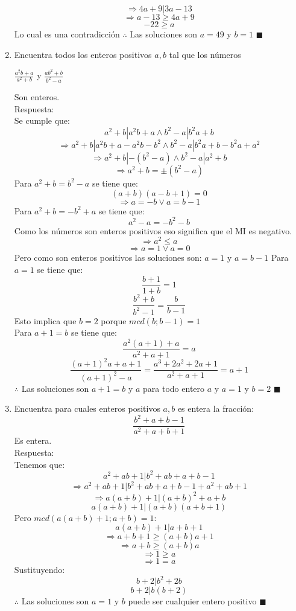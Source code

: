 \documentclass{book}
\begin{document}
\begin{enumerate}
$$\Rightarrow 4a + 9 |3a- 13$$
$$ \Rightarrow a- 13 \geq 4a + 9$$  
$$-22 \geq a $$
Lo cual es una contradicción 
$\therefore$ Las soluciones son $a= 49$ y $   b = 1$ $\blacksquare$  \\
			\item Encuentra todos los enteros positivos $a,b$ tal que los números 
			\begin{center}
				$\displaystyle\frac{a^2b+a}{a^2+b}$ y $\displaystyle\frac{ab^2+b}{b^2-a}$
			\end{center}
			Son enteros.\\
			Respuesta:\\
			Se cumple que:                 
				$$a^2 + b |a^2b + a\wedge b^2 - a| b^2a+ b $$
				$$ \Rightarrow a^2 + b| a^2b + a - a^2b - b^2 \wedge b^2 -a| b^2a + b - b^2a + a^2 $$
				$$ \Rightarrow a^2 + b| -(b^2 - a)  \wedge  b^2 - a |a^2 + b $$
				$$\Rightarrow a^2 + b = \pm(b^2 - a)$$ 
Para $a^2 + b = b^2 - a$ se tiene que: 
$$(a + b)(a - b + 1) = 0$$ 
$$\Rightarrow a=-b \vee a = b- 1$$
 Para $a^2 + b = -b^2 + a $ se tiene que: 
 $$a^2 -a = -b^2 -b$$ 
 Como los números son enteros positivos eso significa que el MI es negativo. 
$$\Rightarrow a^2 \leq a$$ 
$$\Rightarrow a= 1  \vee a= 0$$ 
Pero como son enteros positivos las soluciones son:  $a= 1$  y $a= b- 1$ 
Para $a= 1$ se tiene que:  
$$\frac{b + 1}{1 + b}=1$$
$$\frac{b^2 + b}{b^2 - 1} =\frac{b}{b-1}$$  
Esto implica que $b= 2$ porque $mcd(b;b-1) = 1$ \\
Para $a + 1 =b$ se tiene que: 
$$\frac{a^2(a + 1) + a}{ a^2 + a + 1}=a $$
$$\frac{{(a + 1)}^2 a + a + 1}{{(a + 1)}^2 - a}=\frac{a^3 + 2a^2 + 2a + 1}{ a^2 + a + 1}= a + 1$$ 
$\therefore$ Las soluciones son $a + 1 =b$ y $a$ para todo entero $a$ y $a= 1$ y $b= 2$ $\blacksquare$ \\
			\item  Encuentra para cuales enteros positivos $a,b$ es entera la fracción: 
			$$\frac{b^2+a+b-1}{a^2+a+b+1}$$
			Es entera.\\
			Respuesta:\\
			 Tenemos que: $$a^2 + ab + 1| b^2 + ab + a + b - 1$$
			$$\Rightarrow a^2 + ab + 1| b^2 + ab + a + b - 1 + a^2 + ab + 1 $$
$$\Rightarrow a(a + b) + 1 |{(a + b)}^2 + a + b$$
$$a(a + b) + 1| (a + b)(a + b + 1)$$ 
Pero $mcd(a(a + b) + 1;a + b) = 1$:  
 $$a(a + b) + 1| a + b + 1 $$
 $$\Rightarrow a + b + 1 \geq (a + b)a + 1$$ 
$$\Rightarrow a + b \geq (a + b)a$$ 
$$\Rightarrow 1 \geq a$$ 
$$\Rightarrow 1 = a $$
Sustituyendo: 
$$b + 2| b^2 + 2b$$
$$ b + 2 |b(b + 2)$$
$\therefore$ Las soluciones son $a = 1$ y $b$ puede ser cualquier entero positivo $\blacksquare$\\

\end{enumerate}
\end{document}
